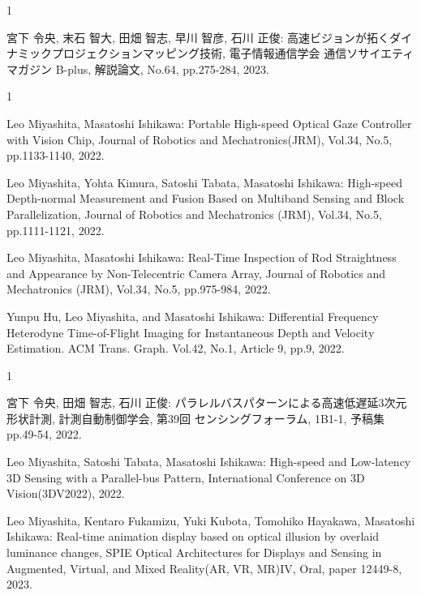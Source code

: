 \begin{招待論文}{1}

宮下 令央, 末石 智大, 田畑 智志, 早川 智彦, 石川 正俊: 高速ビジョンが拓くダイナミックプロジェクションマッピング技術, 電子情報通信学会 通信ソサイエティマガジン B-plus, 解説論文, No.64, pp.275-284, 2023. 

\end{招待論文}

\begin{雑誌論文}{1}

Leo Miyashita, Masatoshi Ishikawa: Portable High-speed Optical Gaze Controller with Vision Chip, Journal of Robotics and Mechatronics(JRM), Vol.34, No.5, pp.1133-1140, 2022.

Leo Miyashita, Yohta Kimura, Satoshi Tabata, Masatoshi Ishikawa: High-speed Depth-normal Measurement and Fusion Based on Multiband Sensing and Block Parallelization, Journal of Robotics and Mechatronics (JRM), Vol.34, No.5, pp.1111-1121, 2022.

Leo Miyashita, Masatoshi Ishikawa: Real-Time Inspection of Rod Straightness and Appearance by Non-Telecentric Camera Array, Journal of Robotics and Mechatronics (JRM), Vol.34, No.5, pp.975-984, 2022.

Yunpu Hu, Leo Miyashita, and Masatoshi Ishikawa: Differential Frequency Heterodyne Time-of-Flight Imaging for Instantaneous Depth and Velocity Estimation. ACM Trans. Graph. Vol.42, No.1, Article 9, pp.9, 2022.

\end{雑誌論文}

\begin{査読付}{1}

宮下 令央, 田畑 智志, 石川 正俊: パラレルバスパターンによる高速低遅延3次元形状計測, 計測自動制御学会, 第39回 センシングフォーラム, 1B1-1, 予稿集 pp.49-54, 2022.

Leo Miyashita, Satoshi Tabata, Masatoshi Ishikawa: High-speed and Low-latency 3D Sensing with a Parallel-bus Pattern, International Conference on 3D Vision(3DV2022), 2022.

Leo Miyashita, Kentaro Fukamizu, Yuki Kubota, Tomohiko Hayakawa, Masatoshi Ishikawa: Real-time animation display based on optical illusion by overlaid luminance changes, SPIE Optical Architectures for Displays and Sensing in Augmented, Virtual, and Mixed Reality(AR, VR, MR)IV, Oral, paper 12449-8, 2023.

\end{査読付}
